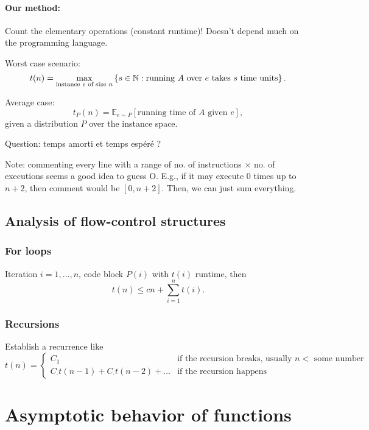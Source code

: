 \paragraph{Our method:}
Count the elementary operations (constant runtime)!
Doesn't depend much on the programming language.

Worst case scenario: \[
t(n) = \max_{\text{instance } e \text{ of size } n} \left\{ s \in \mathbb{N} : \text{running }A\text{ over }e\text{ takes }s\text{ time units} \right\} 
.\] 

Average case: \[
    t_{P}(n) = \mathbb{E}_{e \sim P} \left[ \text{running time of }A\text{ given }e \right] 
,\] given a distribution $P$ over the instance space.

Question: temps amorti et temps espéré ?

Note: commenting every line with a range of no. of instructions $\times $ no. of executions seems a good idea to guess O.
E.g., if it may execute 0 times up to $n+2$, then comment would be $[ 0,n+2] $.
Then, we can just sum everything.


\subsection*{Analysis of flow-control structures}

\subsubsection*{For loops}

Iteration $i=1,\ldots,n$, code block $P(i)$ with $t(i)$ runtime, then \[
t(n) \le c n + \sum_{i=1}^{n} t(i)
.\] 

\subsubsection*{Recursions}

Establish a recurrence like \[
t(n) = \begin{cases}
    C_1  & \text{if the recursion breaks, usually }n<\text{ some number}  \\
    C_{\cdot }t(n-1) + C_{\cdot }t(n-2) + \ldots  & \text{if the recursion happens}
\end{cases}
\] 

\section*{Asymptotic behavior of functions}

